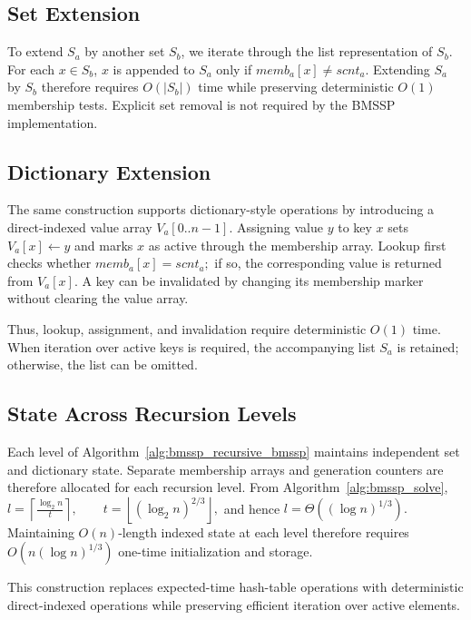 \documentclass[ijoc,blindrev]{informs3} %
\begin{document}
\begin{APPENDICES}
\subsection{Set Extension}

To extend \(S_a\) by another set \(S_b\), we iterate through the list representation of \(S_b\). For each \(x\in S_b\), \(x\) is appended to \(S_a\) only if
\(
\mathit{memb}_a[x]\neq\mathit{scnt}_a.
\)
Extending \(S_a\) by \(S_b\) therefore requires \(O(|S_b|)\) time while preserving deterministic \(O(1)\) membership tests. Explicit set removal is not required by the BMSSP implementation.

\subsection{Dictionary Extension}

The same construction supports dictionary-style operations by introducing a direct-indexed value array
\(
V_a[0..n-1].
\)
Assigning value \(y\) to key \(x\) sets
\(
V_a[x]\leftarrow y
\)
and marks \(x\) as active through the membership array. Lookup first checks whether
\(
\mathit{memb}_a[x]=\mathit{scnt}_a;
\)
if so, the corresponding value is returned from \(V_a[x]\). A key can be invalidated by changing its membership marker without clearing the value array.

Thus, lookup, assignment, and invalidation require deterministic \(O(1)\) time. When iteration over active keys is required, the accompanying list \(S_a\) is retained; otherwise, the list can be omitted.

\subsection{State Across Recursion Levels}

Each level of Algorithm~\ref{alg:bmssp_recursive_bmssp} maintains independent set and dictionary state. Separate membership arrays and generation counters are therefore allocated for each recursion level. From Algorithm~\ref{alg:bmssp_solve},
\(
l=\left\lceil\frac{\log_2 n}{t}\right\rceil,
\qquad
t=\left\lfloor(\log_2 n)^{2/3}\right\rfloor,
\)
and hence
\(
l=\Theta((\log n)^{1/3}).
\)
Maintaining \(O(n)\)-length indexed state at each level therefore requires
\(
O\!\left(n(\log n)^{1/3}\right)
\)
one-time initialization and storage.

This construction replaces expected-time hash-table operations with deterministic direct-indexed operations while preserving efficient iteration over active elements.




\end{APPENDICES}
\end{document}
